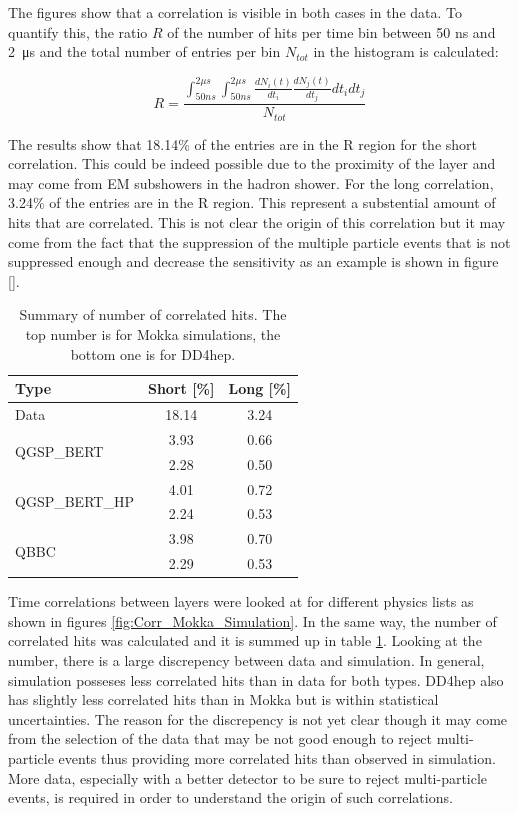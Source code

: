 The figures show that a correlation is visible in both cases in the data. To quantify this, the ratio $R$ of the number of hits per time bin between 50 ns and \SI{2}{\micro\second} and the total number of entries per bin $N_{tot}$ in the histogram is calculated:

\begin{equation}
	R = \frac{\int_{50 ns}^{2 \mu s} \int_{50 ns}^{2 \mu s} \frac{dN_i(t)}{dt_i} \frac{dN_j(t)}{dt_j} dt_i dt_j}{N_{tot}}
\end{equation}

The results show that 18.14\% of the entries are in the R region for the short correlation. This could be indeed possible due to the proximity of the layer and may come from EM subshowers in the hadron shower. For the long correlation, 3.24\% of the entries are in the R region. This represent a substential amount of hits that are correlated. This is not clear the origin of this correlation but it may come from the fact that the suppression of the multiple particle events that is not suppressed enough and decrease the sensitivity as an example is shown in figure \ref{}.

\begin{table}[htb!]
	\centering
	\caption{Summary of number of correlated hits. The top number is for Mokka simulations, the bottom one is for DD4hep.}
	\label{table:Correlation_DataSim}
	\begin{tabular}{@{} |l|cc| @{}}
		\hline
		Type & Short [\%] & Long [\%] \\
		\hline
		Data & 18.14 & 3.24\\
		\hline
		\multirow{2}{*}{QGSP\_BERT} & 3.93 & 0.66\\ & 2.28 & 0.50\\
		\hline
		\multirow{2}{*}{QGSP\_BERT\_HP} & 4.01 & 0.72\\ & 2.24 & 0.53\\
		\hline
		\multirow{2}{*}{QBBC} & 3.98 & 0.70\\ & 2.29 & 0.53\\
		\hline
	\end{tabular}
\end{table}

Time correlations between layers were looked at for different physics lists as shown in figures \ref{fig:Corr_Mokka_Simulation}. In the same way, the number of correlated hits was calculated and it is summed up in table \ref{table:Correlation_DataSim}. Looking at the number, there is a large discrepency between data and simulation. In general, simulation posseses less correlated hits than in data for both types. DD4hep also has slightly less correlated hits than in Mokka but is within statistical uncertainties. The reason for the discrepency is not yet clear though it may come from the selection of the data that may be not good enough to reject multi-particle events thus providing more correlated hits than observed in simulation. More data, especially with a better detector to be sure to reject multi-particle events, is required in order to understand the origin of such correlations.

